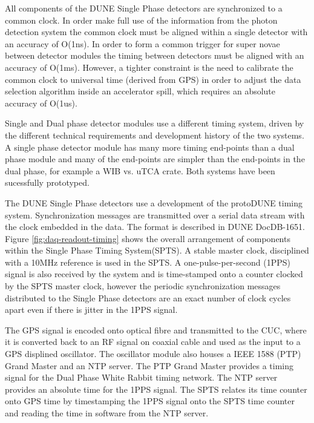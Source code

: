 
All components of the DUNE Single Phase detectors are synchronized to
a common clock. In order make full use of the information from the
photon detection system the common clock must be aligned within a
single detector with an accuracy of O(1ns). In order to form a common
trigger for super novae between detector modules the timing between
detectors must be aligned with an accuracy of O(1ms). However, a
tighter constraint is the need to calibrate the common clock to
universal time (derived from GPS) in order to adjust the data
selection algorithm inside an accelerator spill, which requires an
absolute accuracy of O(1us).

Single and Dual phase detector modules use a different timing system,
driven by the different technical requirements and development history
of the two systems. A single phase detector module has many more
timing end-points than a dual phase module and many of the end-points
are simpler than the end-points in the dual phase, for example a WIB
vs. uTCA crate. Both systems have been sucessfully prototyped.

The DUNE Single Phase detectors use a development of the protoDUNE
timing system. Synchronization messages are transmitted over a serial
data stream with the clock embedded in the data. The format is
described in DUNE DocDB-1651. Figure \ref{fig:daq-readout-timing}
shows the overall arrangement of components within the Single Phase
Timing System(SPTS). A stable master clock, disciplined with a 10MHz
reference is used in the SPTS. A one-pulse-per-second (1PPS) signal is
also received by the system and is time-stamped onto a counter clocked
by the SPTS master clock, however the periodic synchronization
messages distributed to the Single Phase detectors are an exact number
of clock cycles apart even if there is jitter in the 1PPS signal.

The GPS signal is encoded onto optical fibre and transmitted to the
CUC, where it is converted back to an RF signal on coaxial cable and
used as the input to a GPS displined oscillator. The oscillator module
also houses a IEEE 1588 (PTP) Grand Master and an NTP server. The PTP
Grand Master provides a timing signal for the Dual Phase White Rabbit
timing network. The NTP server provides an absolute time for the 1PPS
signal. The SPTS relates its time counter onto GPS time by
timestamping the 1PPS signal onto the SPTS time counter and reading
the time in software from the NTP server.

